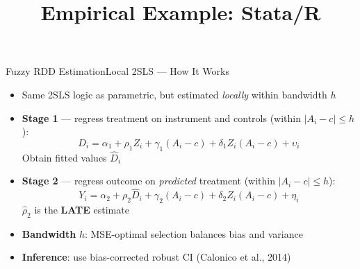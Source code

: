 \documentclass[hyperref={pdfpagelabels=false}]{beamer}
\begin{document}
\begin{frame}{Fuzzy RDD Estimation}{Local 2SLS --- How It Works}
	\begin{itemize}
		\item Same 2SLS logic as parametric, but estimated \emph{locally} within bandwidth $h$
		\vspace{0.15cm}
		\item \textbf{Stage 1} --- regress treatment on instrument and controls (within $|A_i-c|\leq h$):
		\begin{equation*}
			D_i = \alpha_1 + \rho_1 Z_i + \gamma_1(A_i-c) + \delta_1 Z_i(A_i-c) + \upsilon_i
		\end{equation*}
		Obtain fitted values $\hat{D}_i$
		\vspace{0.15cm}
		\item \textbf{Stage 2} --- regress outcome on \emph{predicted} treatment (within $|A_i-c|\leq h$):
		\begin{equation*}
			Y_i = \alpha_2 + \rho_2 \hat{D}_i + \gamma_2(A_i-c) + \delta_2 Z_i(A_i-c) + \eta_i
		\end{equation*}
		$\hat{\rho}_2$ is the \textbf{LATE} estimate
		\vspace{0.15cm}
		\item \textbf{Bandwidth} $h$: MSE-optimal selection balances bias and variance
		\vspace{0.1cm}
		\item \textbf{Inference}: use bias-corrected robust CI (Calonico et al., 2014)
	\end{itemize}
\end{frame}



\title[]
{Empirical Example: Stata/R}

\author
{}

\institute{}

\date
{}

\begin{frame}{}
	\titlepage
\end{frame}
\end{document}
